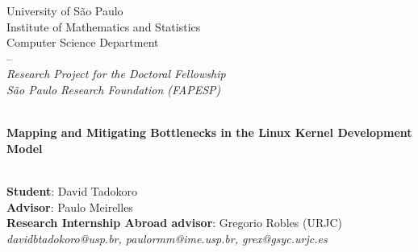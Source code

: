 \documentclass[12pt]{article}
\begin{document}
\onehalfspacing

\begin{center}
University of São Paulo\\
Institute of Mathematics and Statistics\\
Computer Science Department\\
--\\
\textit{Research Project for the Doctoral Fellowship
\\São Paulo Research Foundation (FAPESP)}\\

\hfill\\

\begin{Large}
    \textbf{Mapping and Mitigating Bottlenecks in the Linux Kernel Development Model}
\end{Large}

\hfill\\

\textbf{Student}: David Tadokoro\\
\textbf{Advisor}: Paulo Meirelles\\
\textbf{Research Internship Abroad advisor}: Gregorio Robles (URJC)\\
\textit{davidbtadokoro@usp.br, paulormm@ime.usp.br, grex@gsyc.urjc.es}
\end{center}


\begin{abstract}
The Linux kernel, a FLOSS project with over 30 years of active development, is central to modern computing. Combined with system tools and utilities from the GNU Project, it forms the GNU/Linux ecosystem, which is fundamental for services in our society, such as the Internet, and ubiquitous in the bleeding edge of fields like Machine Learning. The development of Linux is based on the collaboration of thousands of developers worldwide who interact primarily through email and mailing lists. It is a unique development model involving many processes and practices (workflows) that extend beyond the technical aspects of software development. Despite its success, Linux relies on critical workflows and key personnel, raising concerns about sustainability and workforce renewal. As the codebase and community grow in size and complexity, the entry barrier for newcomers and the workload per maintainer should not increase simultaneously. More interestingly, significant time and resources are spent developing tools that address limitations in the Linux kernel development model that the practitioners feel in their day-to-day work, yet these challenges are underexplored in academia. This research project aims to: 1) propose taxonomies that accurately detail the workflows that define the Linux kernel development model and identify inherent bottlenecks; 2) mitigate bottlenecks by developing FLOSS tools that support the Linux ecosystem.\\

\textbf{Keywords}: Linux, FLOSS, Linux kernel development model, FLOSS development model, bottleneck mitigation, software engineering.

\end{abstract}








\printbibliography
\end{document}
